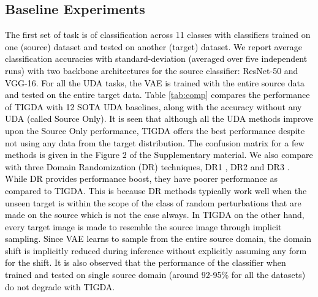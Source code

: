 \documentclass[journal,twoside,web]{IEEEtran}
\newcommand{\bb}{\textcolor{black}}
\begin{document}
\subsection{Baseline Experiments}
\bb{The first set of task is of classification across 11 classes with classifiers trained on one (source) dataset and tested on another (target) dataset. We report average classification accuracies with standard-deviation (averaged over five independent runs) with two backbone architectures for the source classifier: ResNet-50 and VGG-16.} \bb{For all the UDA tasks, the VAE is trained with the entire source data and tested on the entire target data.} \bb{Table \ref{tab:comp} compares the performance of TIGDA with 12 SOTA UDA baselines, along with the accuracy without any UDA (called Source Only). It is seen that although all the UDA methods improve upon the Source Only performance, TIGDA offers the best performance despite not using any data from the target distribution. The confusion matrix for a few methods is given in the Figure 2 of the Supplementary material.  We also compare with three Domain Randomization (DR) techniques, DR1 \cite{mahmood2018deep}, DR2 \cite{toth2018training} and DR3 \cite{zakharov2019deceptionnet}. While DR provides performance boost, they have poorer performance as compared to TIGDA. This is because DR methods typically work well when the unseen target is within the scope of the class of random perturbations that are made on the source} \bb{which is not the case always. In TIGDA on the other hand, every target image is made to resemble the source image through implicit sampling. Since VAE learns to sample from the entire source domain, the domain shift is implicitly reduced during inference without explicitly assuming any form for the shift.}
\bb{It is also observed that the performance of the classifier when trained and tested on single source domain (around 92-95\% for all the datasets) do not degrade with TIGDA.} 
\setlength{\textfloatsep}{0pt}
\end{document}
